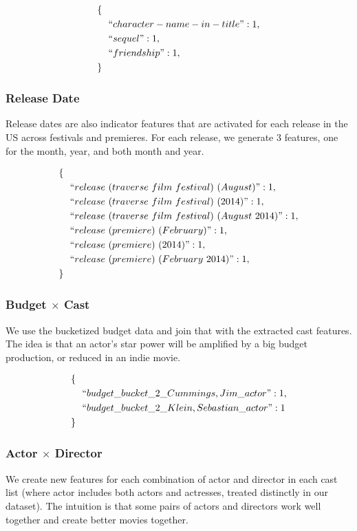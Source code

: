 \documentclass[journal]{IEEEtran}
\begin{document}
\begin{align*}
        \{\ \ &\\
        &``character-name-in-title": 1,\\
        &``sequel": 1,\\
        &``friendship": 1,\\
        \}\ \ &
\end{align*}

\subsubsection{Release Date}
Release dates are also indicator features that are activated for each release
in the US across festivals and premieres. For each release, we generate 3
features, one for the month, year, and both month and year.

\begin{align*}
        \{\ \ &\\
        &``release\ (traverse\ film\ festival)\ (August)": 1, \\
        &``release\ (traverse\ film\ festival)\ (2014)": 1, \\
        &``release\ (traverse\ film\ festival)\ (August\ 2014)": 1, \\
        &``release\ (premiere)\ (February)": 1, \\
        &``release\ (premiere)\ (2014)": 1, \\
        &``release\ (premiere)\ (February\ 2014)": 1, \\
        \}\ \ &
\end{align*}

\subsubsection{Budget $\times$ Cast}
We use the bucketized budget data and join that with the extracted cast
features. The idea is that an actor's star power will be amplified by a big
budget production, or reduced in an indie movie.

\begin{align*}
        \{\ \ &\\
        &``budget\_bucket\_2\_Cummings,Jim\_actor": 1,\\
        &``budget\_bucket\_2\_Klein,Sebastian\_actor": 1\\
        \}\ \ &
\end{align*}

\subsubsection{Actor $\times$ Director}
We create new features for each combination of actor and director in each cast
list (where actor includes both actors and actresses, treated distinctly in our
dataset). The intuition is that some pairs of actors and directors work well
together and create better movies together.
\end{document}

